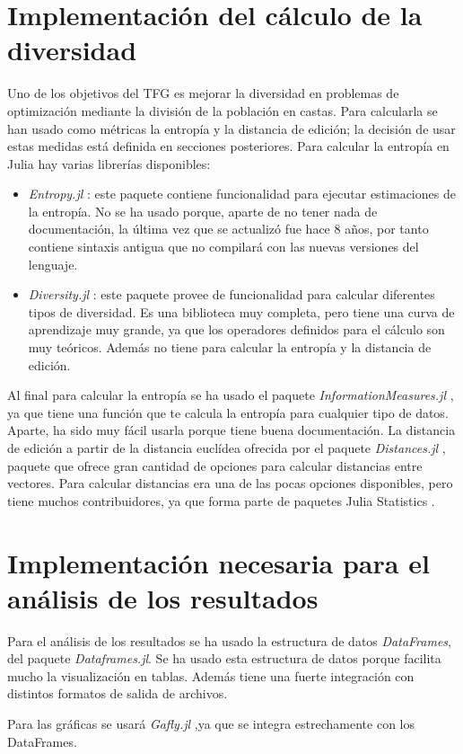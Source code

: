 \section{Implementación del cálculo de la diversidad}

Uno de los objetivos del TFG es mejorar la diversidad en problemas de optimización mediante la división de la población en castas.
Para calcularla se han usado como métricas la entropía y la distancia de edición; la decisión de usar estas medidas
está definida en secciones posteriores. Para calcular la entropía en Julia hay varias librerías disponibles:

\begin{itemize}
    \item \emph{Entropy.jl} \cite{entropy_jl}: este paquete contiene funcionalidad para ejecutar estimaciones de la entropía. No se ha usado porque,
    aparte de no tener nada de documentación, la última vez que se actualizó fue hace 8 años, por tanto contiene
    sintaxis antigua que no compilará con las nuevas versiones del lenguaje.
    \item \emph{Diversity.jl} \cite{diversity_jl}: este paquete provee de funcionalidad para calcular diferentes
    tipos de diversidad. Es una biblioteca muy completa, pero tiene una curva de aprendizaje muy grande, ya que los
    operadores definidos para el cálculo son muy teóricos. Además no tiene para calcular la entropía y la distancia
    de edición.
\end{itemize}

Al final para calcular la entropía se ha usado el paquete \emph{InformationMeasures.jl} \cite{informationMeasures_jl}, ya 
que tiene una función que te calcula la entropía para cualquier tipo de datos. Aparte, ha sido muy fácil usarla porque 
tiene buena documentación. La distancia de edición a partir de la distancia euclídea ofrecida por el paquete
\emph{Distances.jl} \cite{distances_jl}, paquete que ofrece gran cantidad de opciones para calcular distancias entre vectores.
Para calcular distancias era una de las pocas opciones disponibles, pero tiene muchos contribuidores, ya que forma 
parte de paquetes Julia Statistics \cite{stats_jl}.

\section{Implementación necesaria para el análisis de los resultados}

Para el análisis de los resultados se ha usado la estructura de datos \emph{DataFrames}, del paquete \emph{Dataframes.jl}. Se
ha usado esta estructura de datos porque facilita mucho la visualización en tablas. Además tiene una fuerte
integración con distintos formatos de salida de archivos. 

Para las gráficas se usará \emph{Gafly.jl} \cite{gadfly_jl},ya que se integra estrechamente con los DataFrames.
